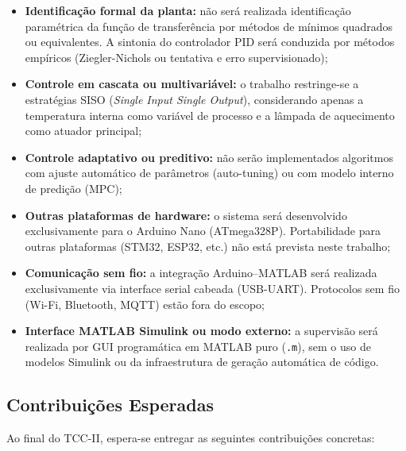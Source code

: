 \documentclass[repeatfields,xlists,xpacks,oneside]{ufrgscca}
\begin{document}
\begin{itemize}
    \item \textbf{Identificação formal da planta:} não será
    realizada identificação paramétrica da função de
    transferência por métodos de mínimos quadrados ou
    equivalentes. A sintonia do controlador PID será
    conduzida por métodos empíricos (Ziegler-Nichols ou
    tentativa e erro supervisionado);

    \item \textbf{Controle em cascata ou multivariável:}
    o trabalho restringe-se a estratégias SISO (\textit{Single
    Input Single Output}), considerando apenas a temperatura
    interna como variável de processo e a lâmpada de
    aquecimento como atuador principal;

    \item \textbf{Controle adaptativo ou preditivo:} não
    serão implementados algoritmos com ajuste automático de
    parâmetros (auto-tuning) ou com modelo interno de predição
    (MPC);

    \item \textbf{Outras plataformas de hardware:} o sistema
    será desenvolvido exclusivamente para o Arduino Nano
    (ATmega328P). Portabilidade para outras plataformas
    (STM32, ESP32, etc.) não está prevista neste trabalho;

    \item \textbf{Comunicação sem fio:} a integração
    Arduino--MATLAB será realizada exclusivamente via
    interface serial cabeada (USB-UART). Protocolos sem fio
    (Wi-Fi, Bluetooth, MQTT) estão fora do escopo;

    \item \textbf{Interface MATLAB Simulink ou modo externo:}
    a supervisão será realizada por GUI programática em
    MATLAB puro (\texttt{.m}), sem o uso de modelos Simulink
    ou da infraestrutura de geração automática de código.
\end{itemize}

\subsection{Contribuições Esperadas}

Ao final do TCC-II, espera-se entregar as seguintes
contribuições concretas:
\end{document}
